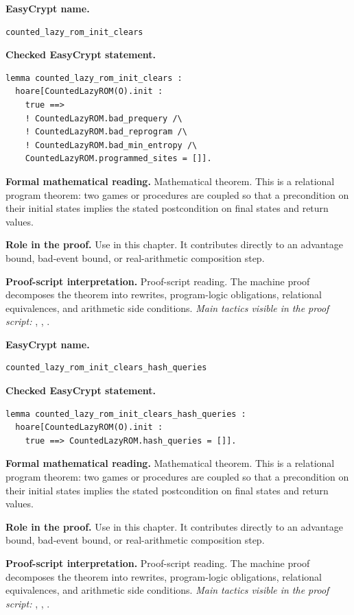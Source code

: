 \begin{formaltheorem}
\noindent\textbf{EasyCrypt name.}
\begin{lstlisting}[language=EasyCrypt,basicstyle=\ttfamily\scriptsize]
counted_lazy_rom_init_clears
\end{lstlisting}
\noindent\textbf{Checked EasyCrypt statement.}
\begin{lstlisting}[language=EasyCrypt,basicstyle=\ttfamily\scriptsize]
lemma counted_lazy_rom_init_clears :
  hoare[CountedLazyROM(O).init :
    true ==>
    ! CountedLazyROM.bad_prequery /\
    ! CountedLazyROM.bad_reprogram /\
    ! CountedLazyROM.bad_min_entropy /\
    CountedLazyROM.programmed_sites = []].
\end{lstlisting}
\noindent\textbf{Formal mathematical reading.}
Mathematical theorem. This is a relational program theorem: two games or procedures are coupled so that a precondition on their initial states implies the stated postcondition on final states and return values.

\noindent\textbf{Role in the proof.}
Use in this chapter. It contributes directly to an advantage bound, bad-event bound, or real-arithmetic composition step.

\noindent\textbf{Proof-script interpretation.}
Proof-script reading. The machine proof decomposes the theorem into rewrites, program-logic obligations, relational equivalences, and arithmetic side conditions.
\emph{Main tactics visible in the proof script:} , , .

\end{formaltheorem}

\begin{formaltheorem}
\noindent\textbf{EasyCrypt name.}
\begin{lstlisting}[language=EasyCrypt,basicstyle=\ttfamily\scriptsize]
counted_lazy_rom_init_clears_hash_queries
\end{lstlisting}
\noindent\textbf{Checked EasyCrypt statement.}
\begin{lstlisting}[language=EasyCrypt,basicstyle=\ttfamily\scriptsize]
lemma counted_lazy_rom_init_clears_hash_queries :
  hoare[CountedLazyROM(O).init :
    true ==> CountedLazyROM.hash_queries = []].
\end{lstlisting}
\noindent\textbf{Formal mathematical reading.}
Mathematical theorem. This is a relational program theorem: two games or procedures are coupled so that a precondition on their initial states implies the stated postcondition on final states and return values.

\noindent\textbf{Role in the proof.}
Use in this chapter. It contributes directly to an advantage bound, bad-event bound, or real-arithmetic composition step.

\noindent\textbf{Proof-script interpretation.}
Proof-script reading. The machine proof decomposes the theorem into rewrites, program-logic obligations, relational equivalences, and arithmetic side conditions.
\emph{Main tactics visible in the proof script:} , , .

\end{formaltheorem}

